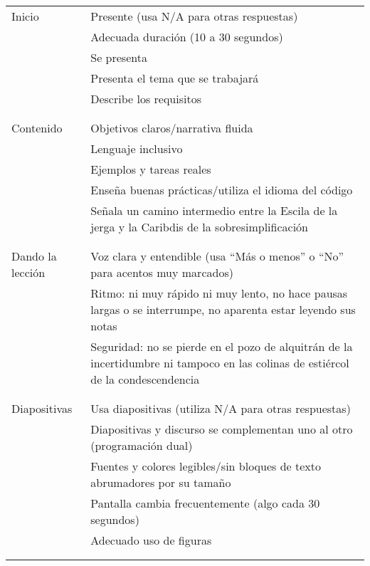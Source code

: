 \noindent
\begin{longtable}{p{}p{}}

  Inicio
  & Presente (usa N/A para otras respuestas) \\
  & Adecuada duración (10 a 30 segundos) \\
  & Se presenta \\
  & Presenta el tema que se trabajará \\
  & Describe los requisitos \\
  \\ [-1.5ex] \hline \\ [-1.5ex]

  Contenido
  & Objetivos claros/narrativa fluida \\
  & Lenguaje inclusivo \\
  & Ejemplos y tareas reales \\
  & Enseña buenas prácticas/utiliza el idioma del código \\
  & Señala un camino intermedio entre la Escila de la jerga y la Caribdis de la sobresimplificación \\
  \\ [-1.5ex] \hline \\ [-1.5ex]

  Dando la lección
  & Voz clara y entendible (usa ``Más o menos'' o ``No'' para acentos muy marcados) \\
  & Ritmo: ni muy rápido ni muy lento, no hace pausas largas o se interrumpe, no aparenta estar leyendo sus notas \\
  & Seguridad: no se pierde en el pozo de alquitrán de la incertidumbre ni tampoco en las colinas de estiércol de la condescendencia \\
  \\ [-1.5ex] \hline \\ [-1.5ex]

  Diapositivas
  & Usa diapositivas (utiliza N/A para otras respuestas) \\
  & Diapositivas y discurso se complementan uno al otro (programación dual) \\
  & Fuentes y colores legibles/sin bloques de texto abrumadores por su tamaño\\
  & Pantalla cambia frecuentemente (algo cada 30 segundos) \\
  & Adecuado uso de figuras \\
  \\ [-1.5ex] \hline \\ [-1.5ex]


\end{longtable}
